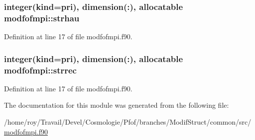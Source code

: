 \hypertarget{classmodfofmpi_a9ace6e4f0b23785f3b93fe1812b07c08}{
\subsubsection[{strhau}]{\setlength{\rightskip}{0pt plus 5cm}integer(kind=pri), dimension(\-:), allocatable modfofmpi\-::strhau}}\label{classmodfofmpi_a9ace6e4f0b23785f3b93fe1812b07c08}


Definition at line 17 of file modfofmpi.\-f90.

\hypertarget{classmodfofmpi_ada00af1a25f50e826521e9b2a7ecb633}{
\subsubsection[{strrec}]{\setlength{\rightskip}{0pt plus 5cm}integer(kind=pri), dimension(\-:), allocatable modfofmpi\-::strrec}}\label{classmodfofmpi_ada00af1a25f50e826521e9b2a7ecb633}


Definition at line 17 of file modfofmpi.\-f90.



The documentation for this module was generated from the following file\-:\begin{DoxyCompactItemize}
\item 
/home/roy/\-Travail/\-Devel/\-Cosmologie/\-Pfof/branches/\-Modif\-Struct/common/src/\hyperlink{modfofmpi_8f90}{modfofmpi.\-f90}\end{DoxyCompactItemize}
